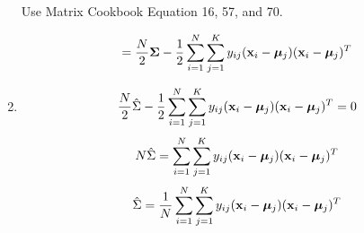 \documentclass[submit]{harvardml}
\begin{document}
\begin{enumerate}
\begin{equation*}
        \end{equation*}
            \begin{center}
            Use Matrix Cookbook Equation 16, 57, and 70.  \end{center}
        \begin{equation*}
            = \frac{N}{2}\mathbf{\Sigma} - \frac{1}{2} \sum_{i=1}^{N}\sum_{j=1}^{K} y_{ij} (\mathbf{x}_i - \boldsymbol{\mu}_j)(\mathbf{x}_i - \boldsymbol{\mu}_j)^T
        \end{equation*}
        \item
        \begin{equation*}
            \frac{N}{2}\hat\Sigma - \frac{1}{2} \sum_{i=1}^{N}\sum_{j=1}^{K} y_{ij} (\mathbf{x}_i - \boldsymbol{\mu}_j)(\mathbf{x}_i - \boldsymbol{\mu}_j)^T = 0
        \end{equation*}
        \begin{equation*}
            N\hat\Sigma = \sum_{i=1}^{N}\sum_{j=1}^{K} y_{ij} (\mathbf{x}_i - \boldsymbol{\mu}_j)(\mathbf{x}_i - \boldsymbol{\mu}_j)^T
        \end{equation*}
        \begin{equation*}
            \hat\Sigma = \frac{1}{N} \sum_{i=1}^{N}\sum_{j=1}^{K} y_{ij} (\mathbf{x}_i - \boldsymbol{\mu}_j)(\mathbf{x}_i - \boldsymbol{\mu}_j)^T
        \end{equation*}
    \end{enumerate}
\end{document}
